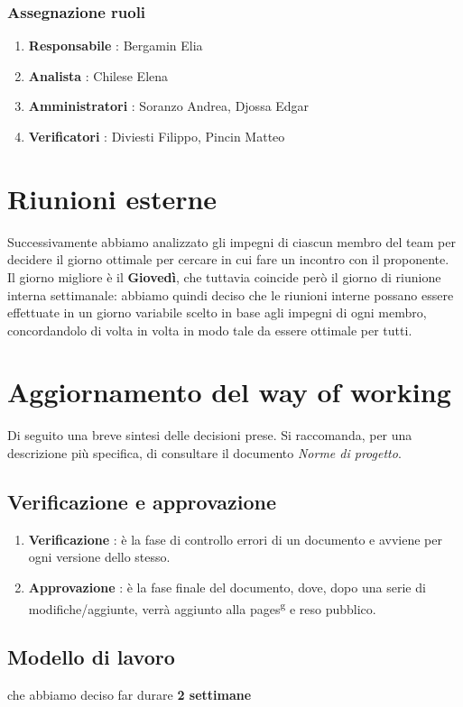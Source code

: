     \subsubsection{Assegnazione ruoli}
    \begin{enumerate}
        \item \textbf{Responsabile} : Bergamin Elia
        \item \textbf{Analista} : Chilese Elena
        \item \textbf{Amministratori} : Soranzo Andrea, Djossa Edgar
        \item \textbf{Verificatori} : Diviesti Filippo, Pincin Matteo
    \end{enumerate}

\section{Riunioni esterne}
Successivamente abbiamo analizzato gli impegni di ciascun membro del team per decidere il giorno ottimale per cercare in cui fare un incontro con il proponente.\\
Il giorno migliore è il \textbf{Giovedì}, che tuttavia coincide però il giorno di riunione interna settimanale: abbiamo quindi deciso che le riunioni interne
possano essere effettuate in un giorno variabile scelto in base agli impegni di ogni membro, concordandolo di volta in volta in modo tale da essere ottimale per tutti. 
\section{Aggiornamento del way of working}
    Di seguito una breve sintesi delle decisioni prese. Si raccomanda, per una descrizione più specifica, di consultare il documento \textit{Norme di progetto}.
    \subsection{Verificazione e approvazione} 
        \begin{enumerate}
            \item \textbf{Verificazione} : è la fase di controllo errori di un documento e avviene per ogni versione dello stesso.
            \item \textbf{Approvazione} : è la fase finale del documento, dove, dopo una serie di modifiche/aggiunte, verrà aggiunto alla pages\textsuperscript{g} e reso pubblico.
        \end{enumerate}
    \subsection{Modello di lavoro}
        che abbiamo deciso far durare \textbf{2 settimane}
